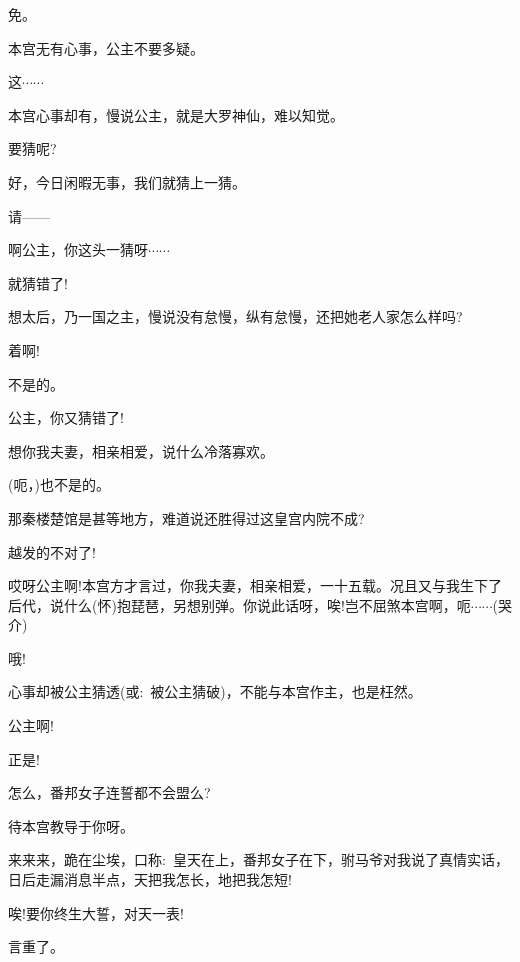{免。

本宫无有心事，公主不要多疑。

这$\cdots{}\cdots{}$

本宫心事却有，慢说公主，就是大罗神仙，难以知觉。

要猜呢?

好，今日闲暇无事，我们就猜上一猜。

请------

啊公主，你这头一猜呀$\cdots{}\cdots{}$

就猜错了!

想太后，乃一国之主，慢说没有怠慢，纵有怠慢，还把她老人家怎么样吗?

着啊!

不是的。

公主，你又猜错了!

想你我夫妻，相亲相爱，说什么冷落寡欢。

(呃，)也不是的。

那秦楼楚馆是甚等地方，难道说还胜得过这皇宫内院不成?

越发的不对了!

哎呀公主啊!本宫方才言过，你我夫妻，相亲相爱，一十五载。况且又与我生下了后代，说什么(怀)抱琵琶，另想别弹。你说此话呀，唉!岂不屈煞本宫啊，呃$\cdots{}\cdots{}$({\hwfs 哭介})

哦!



心事却被公主猜透({\akai 或}:~被公主猜破)，不能与本宫作主，也是枉然。

公主啊!


正是!

怎么，番邦女子连誓都不会盟么?

待本宫教导于你呀。

来来来，跪在尘埃，口称:~皇天在上，番邦女子在下，驸马爷对我说了真情实话，日后走漏消息半点，天把我怎长，地把我怎短!

唉!要你终生大誓，对天一表!

言重了。



}
